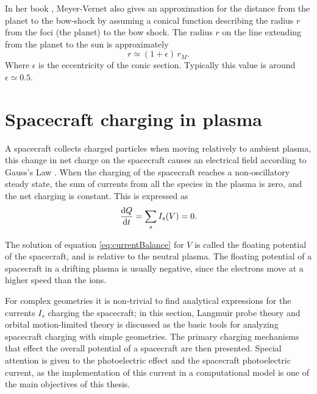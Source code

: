 In her book \parencite{Meyer-Vernet2007}, Meyer-Vernet also gives an approximation for the distance from the planet to the bow-shock by assuming a conical function describing the radius $r$ from the foci (the planet) to the bow shock. The radius $r$ on the line extending from the planet to the sun is approximately
\begin{equation}
    r \simeq (1 + \epsilon) \, r_M.
\end{equation}
Where $\epsilon$ is the eccentricity of the conic section. Typically this value is around $\epsilon \simeq 0.5$.

\section{Spacecraft charging in plasma}
A spacecraft collects charged particles when moving relatively to ambient plasma, this change in net charge on the spacecraft causes an electrical field according to Gauss's Law \parencite[Ch. 1]{LAI2019}. When the charging of the spacecraft reaches a non-oscillatory steady state, the sum of currents from all the species in the plasma is zero, and the net charging is constant. This is expressed as 
\begin{equation} \label{eq:currentBalance}
    \dv{Q}{t} = \sum_s I_s(V) = 0.
\end{equation}

The solution of equation \eqref{eq:currentBalance} for $V$ is called the floating potential of the spacecraft, and is relative to the neutral plasma. The floating potential of a spacecraft in a drifting plasma is usually negative, since the electrons move at a higher speed than the ions.

For complex geometries it is non-trivial to find analytical expressions for the currents $I_s$ charging the spacecraft; in this section, Langmuir probe theory and orbital motion-limited theory is discussed as the basic tools for analyzing spacecraft charging with simple geometries. The primary charging mechanisms that effect the overall potential of a spacecraft are then presented. Special attention is given to the photoelectric effect and the spacecraft photoelectric current, as the implementation of this current in a computational model is one of the main objectives of this thesis.


